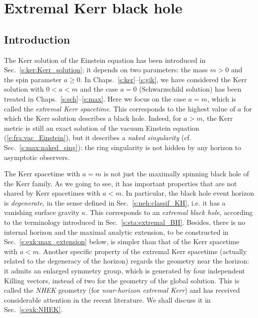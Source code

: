 \chapter{Extremal Kerr black hole}
\label{s:exk}

\minitoc

\section{Introduction}

The Kerr solution of the Einstein equation has been introduced in Sec.~\ref{s:ker:Kerr_solution};
it depends on two parameters: the mass $m > 0$ and the spin parameter
$a \geq 0$.
In Chaps.~\ref{s:ker}--\ref{s:gik}, we have considered the Kerr solution with $0<a<m$
and the case $a=0$ (Schwarzschild solution) has been treated in Chaps.~\ref{s:sch}--\ref{s:max}.
Here we focus on the case $a=m$, which is called the \emph{extremal Kerr spacetime}.
This corresponds to the highest value of $a$
for which the Kerr solution describes a black hole.
Indeed, for $a> m$, the Kerr metric is still an exact
solution of the vacuum Einstein equation (\ref{e:fra:vac_Einstein}), but it describes a \emph{naked singularity} (cf. Sec.~\ref{s:max:naked_sing}):
the ring singularity is not hidden by any horizon to asymptotic observers.

The Kerr spacetime with $a=m$ is not just the maximally spinning black hole of the Kerr family.
As we going to see, it has important properties that are not
shared by Kerr spacetimes with $a<m$. In particular, the black hole event horizon is
\emph{degenerate}, in the sense defined in Sec.~\ref{s:neh:classif_KH}, i.e. it has a
vanishing surface gravity $\kappa$. This corresponds to an \emph{extremal black hole},
according to the terminology introduced in Sec.~\ref{s:sta:extremal_BH}.
Besides, there is no internal horizon
and the maximal analytic extension, to be constructed in Sec.~\ref{s:exk:max_extension}
below, is simpler than
that of the Kerr spacetime with $a<m$.
Another specific property of the extremal Kerr spacetime (actually related
to the degeneracy of the horizon)
regards the geometry near the horizon: it admits an enlarged
symmetry group, which is generated
by four independent Killing vectors,
instead of two for the geometry of the global solution.
This is called the \emph{NHEK} geometry (for \emph{near-horizon extremal Kerr})
and has received considerable attention in the recent literature. We shall
discuss it in Sec.~\ref{s:exk:NHEK}.



